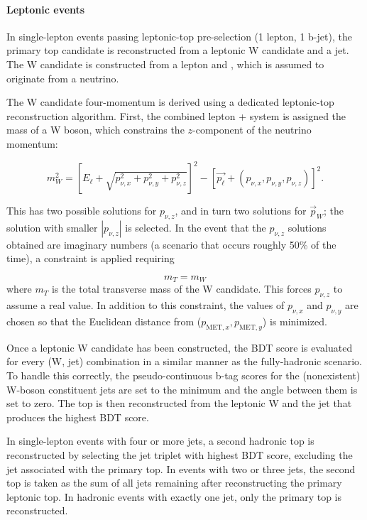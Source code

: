 \paragraph{Leptonic events}
In single-lepton events passing leptonic-top pre-selection (1 lepton, 1 b-jet), the primary top candidate is reconstructed from a leptonic W candidate and a jet. The W candidate is constructed from a lepton and \MET, which is assumed to originate from a neutrino.


The W candidate four-momentum is derived using a dedicated leptonic-top reconstruction algorithm. First, the combined lepton + \MET system is assigned the mass of a W boson, which constrains the $z$-component of the neutrino momentum:

\begin{equation}
m_W^2 = \left[E_\ell + \sqrt{p_{\nu,x}^2 + p_{\nu,y}^2 + p_{\nu,z}^2}\right]^2 - \left[\vec{p_\ell} + (p_{\nu,x},p_{\nu,y},p_{\nu,z})\right]^2.
\end{equation}

This has two possible solutions for $p_{\nu,z}$, and in turn two solutions for $\vec{p}_{W}$; the solution with smaller $|p_{\nu,z}|$ is selected. In the event that the $p_{\nu,z}$ solutions obtained are imaginary numbers (a scenario that occurs roughly 50\% of the time), a constraint is applied requiring

\begin{equation}
m_{T} = m_{W}
\end{equation}
where $m_{T}$ is the total transverse mass of the W candidate. This forces $p_{\nu,z}$ to assume a real value. In addition to this constraint, the values of $p_{\nu,x}$ and  $p_{\nu,y}$ are chosen so that the Euclidean distance from ($p_{\text{MET},x},p_{\text{MET},y}$) is minimized.

Once a leptonic W candidate has been constructed, the BDT score is evaluated for every (W, jet) combination in a similar manner as the fully-hadronic scenario. To handle this correctly, the pseudo-continuous b-tag scores for the (nonexistent) W-boson constituent jets are set to the minimum and the angle between them is set to zero. The top is then reconstructed from the leptonic W and the jet that produces the highest BDT score.

In single-lepton events with four or more jets, a second hadronic top is reconstructed by selecting the jet triplet with highest BDT score, excluding the jet associated with the primary top.  In events with two or three jets, the second top is taken as the sum of all jets remaining after reconstructing the primary leptonic top. In hadronic events with exactly one jet, only the primary top is reconstructed.

